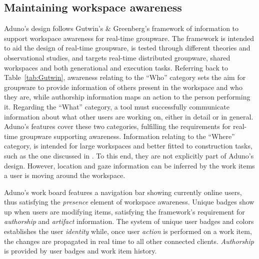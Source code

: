 \documentclass[conference]{IEEEtran}
\begin{document}
\subsection{Maintaining workspace awareness}

Aduno's design follows Gutwin's \& Greenberg's \cite{GG02} framework of information to support workspace awareness for real-time groupware. The framework is intended to aid the design of real-time groupware, is tested through different theories and observational studies, and targets real-time distributed groupware, shared workspaces and both generational and execution tasks. 
Referring back to Table~\ref{tab:Gutwin}, awareness relating to the ``Who'' category sets the aim for groupware to provide information of others present in the workspace and who they are, while authorship information maps an action to the person performing it. Regarding the ``What'' category, a tool must successfully communicate information about what other users are working on, either in detail or in general. Aduno's features cover these two categories, fulfilling the requirements for real-time groupware supporting awareness. Information relating to the ``Where'' category, is intended for large workspaces and better fitted to construction tasks, such as the one discussed in \cite{GRG96}. 
To this end, they are not explicitly part of Aduno's design. However, location and gaze information can be inferred by the work items a user is moving around the workspace.


Aduno's work board features a navigation bar showing currently online users, thus satisfying the \textit{presence} element of workspace awareness. Unique badges show up when users are modifying items, satisfying the framework's requirement for \textit{authorship} and \textit{artifact} information.  The system of unique user badges and colors establishes the user \textit{identity} while, once user \textit{action} is performed on a work item, the changes are propagated in real time to all other connected clients.  \textit{Authorship} is provided by user badges and work item history. 
\end{document}
